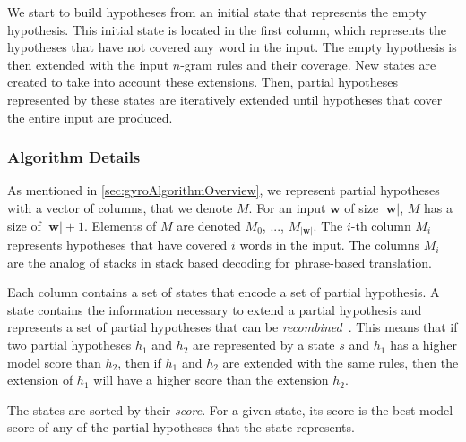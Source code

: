 We start to build hypotheses from an initial state that
represents the empty hypothesis. This initial state
is located in the first column, which represents the
hypotheses that have not covered any word in the input.
The empty hypothesis is then extended with the input
$n$-gram rules and their coverage. New states are created
to take into account these extensions. Then, partial
hypotheses represented by these states are iteratively
extended until hypotheses that cover the entire input
are produced.

\subsubsection{Algorithm Details}

As mentioned in \ref{sec:gyroAlgorithmOverview}, we represent
partial hypotheses with a vector of columns, that we denote
$M$. For an input $\bm{w}$ of size $|\bm{w}|$, $M$ has a size
of $|\bm{w}| + 1$. Elements of $M$ are denoted $M_0$, ..., $M_{|\bm{w}|}$.
The $i$-th column $M_i$ represents hypotheses that have covered
$i$ words in the input. The columns $M_i$ are the analog of stacks
in stack based decoding for phrase-based translation.

Each column contains a set of states that encode a set of partial
hypothesis. A state contains the information necessary to
extend a partial hypothesis and represents a set of
partial hypotheses that can be \emph{recombined}~\citep{koehn:2010:book}.
This means that if two partial hypotheses $h_1$ and $h_2$
are represented by a state $s$ and $h_1$ has a higher model score than
$h_2$, then if $h_1$ and $h_2$ are extended with the same rules, then
the extension of $h_1$ will have a higher score than the extension $h_2$.

The states are sorted by their \emph{score}.
For a given state, its score is the best model score of any of the partial
hypotheses that the state represents.

